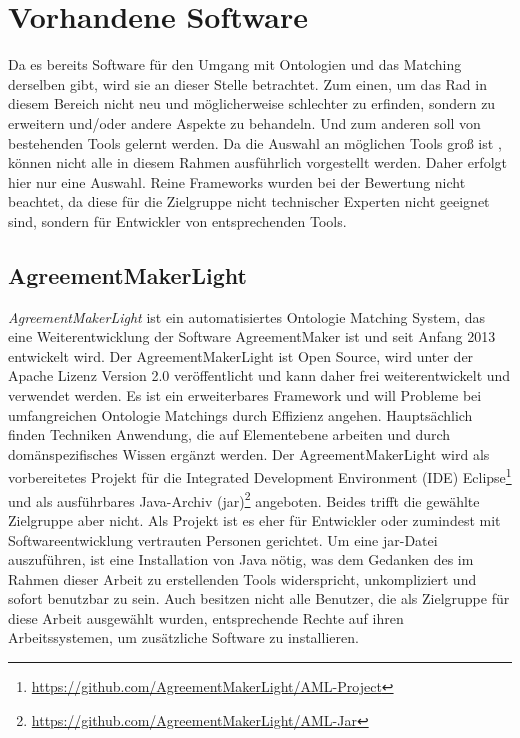 %
\chapter{Vorhandene Software}
\label{chap:existingSoftware}
		
		Da es bereits Software für den Umgang mit Ontologien und das Matching
		derselben gibt, wird sie an dieser Stelle betrachtet. Zum einen, um das Rad in diesem
		Bereich nicht neu und möglicherweise schlechter zu erfinden, sondern zu
		erweitern und/oder andere Aspekte zu behandeln. Und zum anderen soll von
		bestehenden Tools gelernt werden. Da die Auswahl an möglichen Tools groß ist
		\cite{Ber14}\cite{Shv13}\cite{Eng08}, können nicht alle in diesem Rahmen
		ausführlich vorgestellt werden. Daher erfolgt hier nur eine Auswahl. Reine
		Frameworks wurden bei der Bewertung nicht beachtet, da diese für die
		Zielgruppe nicht technischer Experten nicht geeignet sind, sondern für
		Entwickler von entsprechenden Tools.
		
		\section{AgreementMakerLight}
		\textit{AgreementMakerLight} ist ein automatisiertes Ontologie Matching System,
		das eine Weiterentwicklung der Software AgreementMaker ist und seit Anfang
		2013 entwickelt wird. Der AgreementMakerLight ist Open Source, wird unter der
		Apache Lizenz Version 2.0 veröffentlicht und kann daher frei weiterentwickelt
		und verwendet werden. Es ist ein erweiterbares Framework und will Probleme bei
		umfangreichen Ontologie Matchings durch Effizienz angehen. Hauptsächlich
		finden Techniken Anwendung, die auf Elementebene arbeiten und durch
		domänspezifisches Wissen ergänzt werden.
		Der AgreementMakerLight wird als vorbereitetes Projekt für die Integrated
		Development Environment (IDE)
		Eclipse\footnote{\url{https://github.com/AgreementMakerLight/AML-Project}} und
		als ausführbares Java-Archiv
		(jar)\footnote{\url{https://github.com/AgreementMakerLight/AML-Jar}}
		angeboten. Beides trifft die gewählte Zielgruppe aber nicht.
		Als Projekt ist es eher für Entwickler oder zumindest mit Softwareentwicklung
		vertrauten Personen gerichtet. Um eine jar-Datei auszuführen, ist eine
		Installation von Java nötig, was dem Gedanken des im Rahmen dieser Arbeit zu
		erstellenden Tools widerspricht, unkompliziert und sofort benutzbar zu sein.
		Auch besitzen nicht alle Benutzer, die als Zielgruppe für diese Arbeit
		ausgewählt wurden, entsprechende Rechte auf ihren Arbeitssystemen, um
		zusätzliche Software zu installieren.
		
